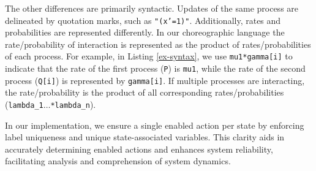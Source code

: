 The other differences are primarily syntactic. Updates of the same process are delineated by quotation marks, such as \texttt{"(x'=1)"}. Additionally, rates and probabilities are represented differently. In our choreographic language the rate/probability of interaction is represented as the product of rates/probabilities of each process. For example, in Listing \ref{ex-syntax}, we use \texttt{mu1*gamma[i]} to indicate that the rate of the first process (\texttt{P}) is \texttt{mu1}, while the rate of the second process (\texttt{Q[i]}) is represented by \texttt{gamma[i]}. If multiple processes are interacting, the rate/probability is the product of all corresponding rates/probabilities (\texttt{lambda\_1$\ldots$*lambda\_n}).

In our implementation, we ensure a single enabled action per state by enforcing label uniqueness and unique state-associated variables. This clarity aids in accurately determining enabled actions and enhances system reliability, facilitating analysis and comprehension of system dynamics.



